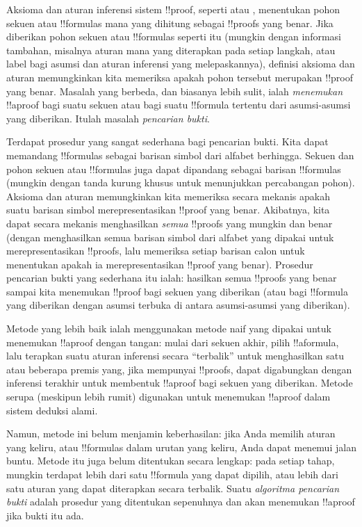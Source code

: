 \documentclass[../../../include/open-logic-section]{subfiles}
\begin{document}


Aksioma dan aturan inferensi sistem !!{proof}, seperti  atau
, menentukan pohon sekuen atau !!{formula}s mana yang dihitung
sebagai !!{proof}s yang benar. Jika diberikan pohon sekuen atau !!{formula}s
seperti itu (mungkin dengan informasi tambahan, misalnya aturan mana yang
diterapkan pada setiap langkah, atau label bagi asumsi dan aturan inferensi
yang melepaskannya), definisi aksioma dan aturan memungkinkan kita memeriksa
apakah pohon tersebut merupakan !!{proof} yang benar. Masalah yang berbeda,
dan biasanya lebih sulit, ialah \emph{menemukan} !!a{proof} bagi suatu sekuen
atau bagi suatu !!{formula} tertentu dari asumsi-asumsi yang diberikan.
Itulah masalah \emph{pencarian bukti}.

Terdapat prosedur yang sangat sederhana bagi pencarian bukti. Kita dapat
memandang !!{formula}s sebagai barisan simbol dari alfabet berhingga. Sekuen
dan pohon sekuen atau !!{formula}s juga dapat dipandang sebagai barisan
!!{formula}s (mungkin dengan tanda kurung khusus untuk menunjukkan
percabangan pohon). Aksioma dan aturan memungkinkan kita memeriksa secara
mekanis apakah suatu barisan simbol merepresentasikan !!{proof} yang benar.
Akibatnya, kita dapat secara mekanis menghasilkan \emph{semua} !!{proof}s
yang mungkin dan benar (dengan menghasilkan semua barisan simbol dari
alfabet yang dipakai untuk merepresentasikan !!{proof}s, lalu memeriksa
setiap barisan calon untuk menentukan apakah ia merepresentasikan
!!{proof} yang benar). Prosedur pencarian bukti yang sederhana itu ialah:
hasilkan semua !!{proof}s yang benar sampai kita menemukan !!{proof} bagi
sekuen yang diberikan (atau bagi !!{formula} yang diberikan dengan asumsi
terbuka di antara asumsi-asumsi yang diberikan).

Metode yang lebih baik ialah menggunakan metode naif yang dipakai untuk
menemukan !!a{proof} dengan tangan: mulai dari sekuen akhir, pilih
!!a{formula}, lalu terapkan suatu aturan inferensi secara ``terbalik'' untuk
menghasilkan satu atau beberapa premis yang, jika mempunyai !!{proof}s,
dapat digabungkan dengan inferensi terakhir untuk membentuk !!a{proof} bagi
sekuen yang diberikan. Metode serupa (meskipun lebih rumit) digunakan untuk
menemukan !!a{proof} dalam sistem deduksi alami.

Namun, metode ini belum menjamin keberhasilan: jika Anda memilih aturan yang
keliru, atau !!{formula}s dalam urutan yang keliru, Anda dapat menemui jalan
buntu. Metode itu juga belum ditentukan secara lengkap: pada setiap tahap,
mungkin terdapat lebih dari satu !!{formula} yang dapat dipilih, atau lebih
dari satu aturan yang dapat diterapkan secara terbalik. Suatu
\emph{algoritma pencarian bukti} adalah prosedur yang ditentukan sepenuhnya
dan akan menemukan !!a{proof} jika bukti itu ada.
\end{document}
